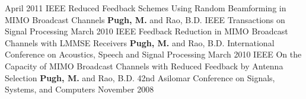 \begin{cventries}
    {April 2011}
    {}
\cvpublicationentry
    {IEEE}
    {Reduced Feedback Schemes Using Random Beamforming in MIMO Broadcast Channels}
    {\textbf{Pugh, M.} and Rao, B.D.}
    {IEEE Transactions on Signal Processing}
    {March 2010}
    {}
\cvpublicationentry
    {IEEE}
    {Feedback Reduction in MIMO Broadcast Channels with LMMSE Receivers}
    {\textbf{Pugh, M.} and Rao, B.D.}
    {International Conference on Acoustics, Speech and Signal Processing}
    {March 2010}
    {}
\cvpublicationentry
    {IEEE}
    {On the Capacity of MIMO Broadcast Channels with Reduced Feedback by Antenna Selection}
    {\textbf{Pugh, M.} and Rao, B.D.}
    {42nd Asilomar Conference on Signals, Systems, and Computers}
    {November 2008}
    {}
\end{cventries}


